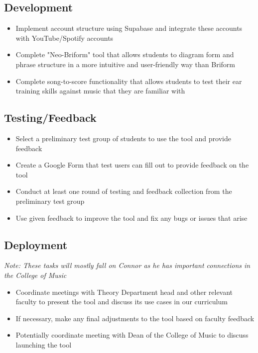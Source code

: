 \documentclass[12pt, letterpaper]{article}
\begin{document}
\subsection*{Development}
\begin{itemize}
    \item[--] Implement account structure using Supabase and integrate these accounts with YouTube/Spotify accounts
    \item[--] Complete "Neo-Briform" tool that allows students to diagram form and phrase structure in a more intuitive and user-friendly way than Briform
    \item[--] Complete song-to-score functionality that allows students to test their ear training skills against music that they are familiar with
\end{itemize}

\subsection*{Testing/Feedback}
\begin{itemize}
    \item[--] Select a preliminary test group of students to use the tool and provide feedback
    \item[--] Create a Google Form that test users can fill out to provide feedback on the tool
    \item[--] Conduct at least one round of testing and feedback collection from the preliminary test group
    \item[--] Use given feedback to improve the tool and fix any bugs or issues that arise
\end{itemize}

\subsection*{Deployment}
\textit{Note: These tasks will mostly fall on Connor as he has important connections in the College of Music}
\begin{itemize}
    \item[--] Coordinate meetings with Theory Department head and other relevant faculty to present the tool and discuss its use cases in our curriculum
    \item[--] If necessary, make any final adjustments to the tool based on faculty feedback
    \item[--] Potentially coordinate meeting with Dean of the College of Music to discuss launching the tool
\end{itemize}
\end{document}
